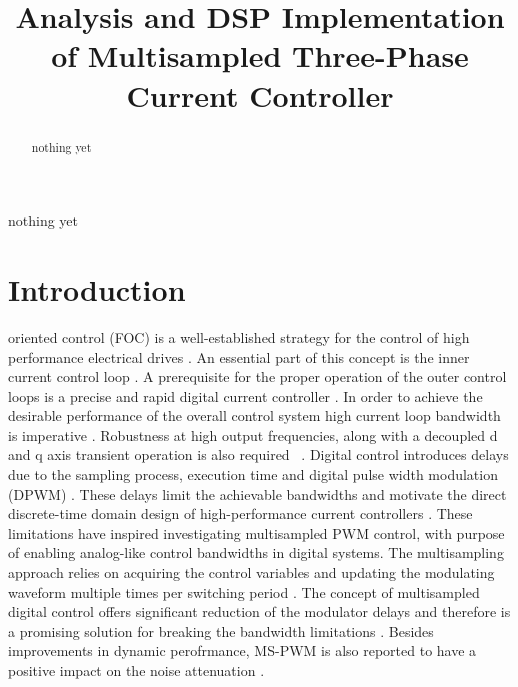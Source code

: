 \documentclass[journal]{IEEEtran}
\begin{document}
\title{Analysis and DSP Implementation of Multisampled Three-Phase Current Controller}


\maketitle

\begin{abstract}
nothing yet
\end{abstract}

\begin{IEEEkeywords}
nothing yet
\end{IEEEkeywords}


\IEEEpeerreviewmaketitle

\section{Introduction}
 oriented control (FOC) is a well-established strategy for the control of high performance electrical drives \cite{holmes2012}. An essential part of this concept is the inner current control loop \cite{holmes2009}. A prerequisite for the proper operation of the outer control loops is a precise and rapid digital current controller \cite{yepes2014}. In order to achieve the desirable performance of the overall control system high current loop bandwidth is imperative \cite{choi1998}. Robustness at high output frequencies, along with a decoupled d and q axis transient operation is also required ~\cite{choi1998,hoffmann2016,yim2009}. Digital control introduces delays due to the sampling process, execution time and digital pulse width modulation (DPWM) \cite{holmes2009}. These delays limit the achievable bandwidths and motivate the direct discrete-time domain design of high-performance current controllers \cite{bae2003}. These limitations have inspired investigating multisampled PWM control, with purpose of enabling analog-like control bandwidths in digital systems. The multisampling approach relies on acquiring the control variables and updating the modulating waveform multiple times per switching period \cite{corradini_analysis}. The concept of multisampled digital control offers significant reduction of the modulator delays and therefore is a promising solution for breaking the bandwidth limitations \cite{corradini2018}. Besides improvements in dynamic perofrmance, MS-PWM is also reported to have a positive impact on the noise attenuation \cite{petric2020}. 
\end{document}
